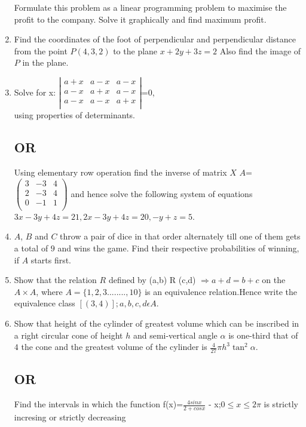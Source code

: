 \documentclass{article}
\begin{document}
\begin{enumerate}
Formulate this problem as a linear programming problem to maximise the profit to the company. Solve it graphically and find maximum profit.

       \item Find the coordinates of the foot of perpendicular and perpendicular distance from the point $P(4, 3, 2)$ to the plane $x + 2y + 3z = 2$ Also find the image of $P$ in the plane.  
       \item  Solve for x: $\left|\begin{matrix}a+x&a-x&a-x\\ a-                                                      
x&a+x&a-x\\a-x&a-x&a+x\\ \end{matrix} \right|$=$0$,\\using properties of determinants.\subsection*{\centering OR}Using elementary row operation find the inverse of matrix $X$ $A$=$\left(\begin{matrix}3&-3&4\\2&-3&4\\0&-1&1\\ \end{matrix}\right)$ and hence solve the following system of equations $3x-3y+4z=21,2x-3y+4z=20,-y+z=5$.                                                 
       

       \item $A$, $B$ and $C$ throw a pair of dice in that order alternately till one of them gets a total of $9$ and wins the game. Find their respective probabilities of winning, if $A$ starts first.
       
       \item Show that the relation $R$ defined by (a,b) R (c,d) $\Rightarrow a+d=b+c $ on the $A \times A$, where $A=\{1,2,3........,10\}$ is an equivalence relation.Hence write the equivalence class $[(3,4)];a,b,c,d \epsilon A$.

       \item Show that height of the cylinder of greatest volume which can be inscribed in a right circular cone of height $h$ and semi-vertical angle $\alpha$ is one-third that of $4$ the cone and the greatest volume of the cylinder is $\frac {4} {27} \pi h^3 \tan^2 \alpha $. \subsection*{\centering OR}Find the intervals in which the function  f(x)=$ \frac {4sinx} {2+cosx} $ - x;$0 \leq x \leq 2 \pi$ is strictly incresing or strictly decreasing  
              
\end{enumerate}
\end{document}
